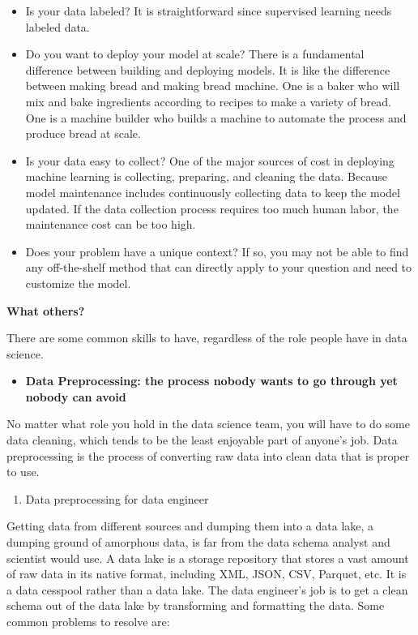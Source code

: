 \documentclass[12pt,]{krantz}
\providecommand{\tightlist}{%
  \setlength{\itemsep}{0pt}\setlength{\parskip}{0pt}}
\begin{document}
\begin{itemize}
\item
  Is your data labeled? It is straightforward since supervised learning needs labeled data.
\item
  Do you want to deploy your model at scale? There is a fundamental difference between building and deploying models. It is like the difference between making bread and making bread machine. One is a baker who will mix and bake ingredients according to recipes to make a variety of bread. One is a machine builder who builds a machine to automate the process and produce bread at scale.
\item
  Is your data easy to collect? One of the major sources of cost in deploying machine learning is collecting, preparing, and cleaning the data. Because model maintenance includes continuously collecting data to keep the model updated. If the data collection process requires too much human labor, the maintenance cost can be too high.
\item
  Does your problem have a unique context? If so, you may not be able to find any off-the-shelf method that can directly apply to your question and need to customize the model.
\end{itemize}

\textbf{What others?}

There are some common skills to have, regardless of the role people have in data science.

\begin{itemize}
\tightlist
\item
  \textbf{Data Preprocessing: the process nobody wants to go through yet nobody can avoid}
\end{itemize}

No matter what role you hold in the data science team, you will have to do some data cleaning, which tends to be the least enjoyable part of anyone's job. Data preprocessing is the process of converting raw data into clean data that is proper to use.

\begin{enumerate}
\def\labelenumi{(\arabic{enumi})}
\tightlist
\item
  Data preprocessing for data engineer
\end{enumerate}

Getting data from different sources and dumping them into a data lake, a dumping ground of amorphous data, is far from the data schema analyst and scientist would use. A data lake is a storage repository that stores a vast amount of raw data in its native format, including XML, JSON, CSV, Parquet, etc. It is a data cesspool rather than a data lake. The data engineer's job is to get a clean schema out of the data lake by transforming and formatting the data. Some common problems to resolve are:
\end{document}
